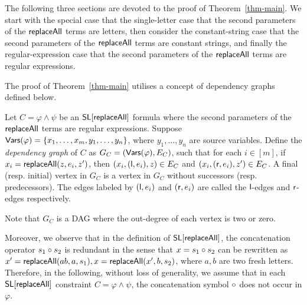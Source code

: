The following three sections are devoted to the proof of Theorem~\ref{thm-main}. We start with the special case that the single-letter case that the second parameters of the $\mathsf{replaceAll}$ terms are letters, then consider the constant-string case that the second parameters of the $\mathsf{replaceAll}$ terms are constant strings, and finally the regular-expression case that the second parameters of the $\mathsf{replaceAll}$ terms are regular expressions.

The proof of Theorem~\ref{thm-main} utilises a concept of dependency graphs defined below.

\begin{definition}
	Let $C= \varphi \wedge \psi$ be an $\mathsf{SL}[\mathsf{replaceAll}]$ formula where the second parameters of the $\mathsf{replaceAll}$ terms are regular expressions. Suppose $\mathsf{Vars}(\varphi) = \{x_1,\dots, x_m, y_1, \dots, y_n\}$, where $y_1,\dots, y_n$ are  source variables. Define the \emph{dependency graph} of $C$ as $G_C= (\mathsf{Vars}(\varphi), E_C)$, such that for each $i \in [m]$, if $x_i = \mathsf{replaceAll}(z, e_i, z')$, then $(x_i, (\mathsf{l}, e_i), z) \in E_C$ and $(x_i, (\mathsf{r}, e_i), z') \in E_C$. A final (resp. initial) vertex in $G_C$ is a vertex in $G_C$ without successors (resp. predecessors). The edges labeled by $(\mathsf{l}, e_i)$ and $(\mathsf{r}, e_i)$ are called the $\mathsf{l}$-edges and $\mathsf{r}$-edges respectively. 
\end{definition}
Note that $G_C$ is a DAG where the out-degree of each vertex is two or zero. 

Moreover, we observe that in the definition of $\mathsf{SL}[\mathsf{replaceAll}]$,
%
the concatenation operator $s_1 \circ s_2$ is redundant in the sense that $x = s_1 \circ s_2$ can be rewritten as $x' = \mathsf{replaceAll}(ab, a, s_1), x = \mathsf{replaceAll}(x', b, s_2)$, where $a,b$ are two fresh letters.
%
Therefore,  in the following, without loss of generality, we assume that 
in each $\mathsf{SL}[\mathsf{replaceAll}]$ constraint $C=\varphi \wedge \psi$, the concatenation symbol $\circ$ does not occur in $\varphi$. 

